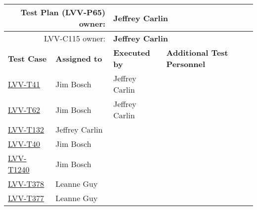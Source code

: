 \documentclass[DM,lsstdraft,STR,toc]{lsstdoc}
\begin{document}
\begin{longtable}{p{3cm}p{3cm}p{3cm}p{6cm}}
\hline
\multicolumn{2}{r}{Test Plan (LVV-P65) owner:} &
\multicolumn{2}{l}{\textbf{ Jeffrey Carlin } }\\\hline
\multicolumn{2}{r}{ LVV-C115 owner:} &
\multicolumn{2}{l}{\textbf{
    Jeffrey Carlin
}
} \\\hline
\textbf{Test Case} & \textbf{Assigned to} & \textbf{Executed by} & \textbf{Additional Test Personnel} \\ \hline
\href{https://jira.lsstcorp.org/secure/Tests.jspa#/testCase/LVV-T41}{LVV-T41}
& {\small Jim Bosch } & {\small Jeffrey Carlin } &
\begin{minipage}[]{6cm}
\smallskip
{\small  }
\medskip
\end{minipage}
\\ \hline
\href{https://jira.lsstcorp.org/secure/Tests.jspa#/testCase/LVV-T62}{LVV-T62}
& {\small Jim Bosch } & {\small Jeffrey Carlin } &
\begin{minipage}[]{6cm}
\smallskip
{\small  }
\medskip
\end{minipage}
\\ \hline
\href{https://jira.lsstcorp.org/secure/Tests.jspa#/testCase/LVV-T132}{LVV-T132}
& {\small Jeffrey Carlin } & {\small  } &
\begin{minipage}[]{6cm}
\smallskip
{\small  }
\medskip
\end{minipage}
\\ \hline
\href{https://jira.lsstcorp.org/secure/Tests.jspa#/testCase/LVV-T40}{LVV-T40}
& {\small Jim Bosch } & {\small  } &
\begin{minipage}[]{6cm}
\smallskip
{\small  }
\medskip
\end{minipage}
\\ \hline
\href{https://jira.lsstcorp.org/secure/Tests.jspa#/testCase/LVV-T1240}{LVV-T1240}
& {\small Jim Bosch } & {\small  } &
\begin{minipage}[]{6cm}
\smallskip
{\small  }
\medskip
\end{minipage}
\\ \hline
\href{https://jira.lsstcorp.org/secure/Tests.jspa#/testCase/LVV-T378}{LVV-T378}
& {\small Leanne Guy } & {\small  } &
\begin{minipage}[]{6cm}
\smallskip
{\small  }
\medskip
\end{minipage}
\\ \hline
\href{https://jira.lsstcorp.org/secure/Tests.jspa#/testCase/LVV-T377}{LVV-T377}
& {\small Leanne Guy } & {\small  } &
\begin{minipage}[]{6cm}

\end{minipage}
\end{longtable}
\end{document}
